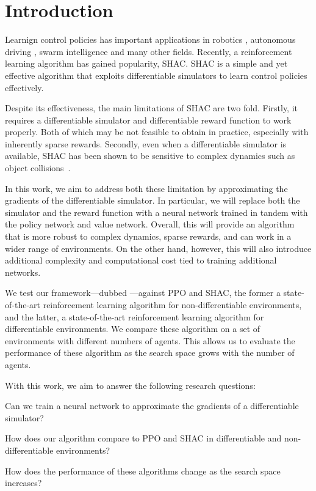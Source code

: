 \section{Introduction}

Learnign control policies has important applications in robotics \cite{Singh22}, autonomous driving \cite{Elallid22}, swarm intelligence \cite{Tang21} and many other fields. Recently, a reinforcement learning algorithm has gained popularity, SHAC\cite{Xu22}. SHAC is a simple and yet effective algorithm that exploits differentiable simulators to learn control policies effectively. 

Despite its effectiveness, the main limitations of SHAC are two fold. Firstly, it requires a differentiable simulator and differentiable reward function to work properly. Both of which may be not feasible to obtain in practice, especially with inherently sparse rewards. Secondly, even when a differentiable simulator is available, SHAC has been shown to be sensitive to complex dynamics such as object collisions~\cite{Georgiev24}.

In this work, we aim to address both these limitation by approximating the gradients of the differentiable simulator. In particular, we will replace both the simulator and the reward function with a neural network trained in tandem with the policy network and value network. Overall, this will provide an algorithm that is more robust to complex dynamics, sparse rewards, and can work in a wider range of environments. On the other hand, however, this will also introduce additional complexity and computational cost tied to training additional networks.

We test our framework---dubbed \fname{}---against PPO\cite{Schulman17} and SHAC\cite{Xu22}, the former a state-of-the-art reinforcement learning algorithm for non-differentiable environments, and the latter, a state-of-the-art reinforcement learning algorithm for differentiable environments. We compare these algorithm on a set of environments with different numbers of agents. This allows us to evaluate the performance of these algorithm as the search space grows with the number of agents.

With this work, we aim to answer the following research questions:
\begin{compactitem}
    \item {} Can we train a neural network to approximate the gradients of a differentiable simulator?
    \item {} How does our algorithm compare to PPO and SHAC in differentiable and non-differentiable environments?
    \item {} How does the performance of these algorithms change as the search space increases?
\end{compactitem}

